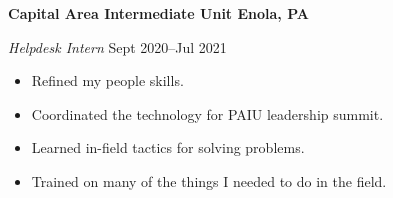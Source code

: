 \textbf{Capital Area Intermediate Unit \hfill  Enola, PA} \par
\textit{Helpdesk Intern} \hfill Sept 2020--Jul 2021 \par
\begin{itemize}
	\item Refined my people skills.
	\item Coordinated the technology for PAIU leadership summit.
	\item Learned in-field tactics for solving problems.
	\item Trained on many of the things I needed to do in the field.
\end{itemize} \par